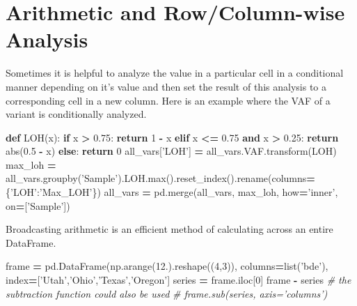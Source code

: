 \documentclass[]{book}
\newenvironment{Shaded}{\begin{snugshade}}{\end{snugshade}}
\newcommand{\BuiltInTok}[1]{#1}
\newcommand{\CommentTok}[1]{\textcolor[rgb]{0.56,0.35,0.01}{\textit{#1}}}
\newcommand{\ControlFlowTok}[1]{\textcolor[rgb]{0.13,0.29,0.53}{\textbf{#1}}}
\newcommand{\DecValTok}[1]{\textcolor[rgb]{0.00,0.00,0.81}{#1}}
\newcommand{\FloatTok}[1]{\textcolor[rgb]{0.00,0.00,0.81}{#1}}
\newcommand{\KeywordTok}[1]{\textcolor[rgb]{0.13,0.29,0.53}{\textbf{#1}}}
\newcommand{\NormalTok}[1]{#1}
\newcommand{\OperatorTok}[1]{\textcolor[rgb]{0.81,0.36,0.00}{\textbf{#1}}}
\newcommand{\StringTok}[1]{\textcolor[rgb]{0.31,0.60,0.02}{#1}}
\begin{document}
\hypertarget{arithmetic-and-rowcolumn-wise-analysis}{%
\section{Arithmetic and Row/Column-wise Analysis}\label{arithmetic-and-rowcolumn-wise-analysis}}

Sometimes it is helpful to analyze the value in a particular cell in a conditional manner depending on it's value and then set the result of this analysis to a corresponding cell in a new column. Here is an example where the VAF of a variant is conditionally analyzed.

\begin{Shaded}
\begin{Highlighting}[]
\KeywordTok{def}\NormalTok{ LOH(x):}
    \ControlFlowTok{if}\NormalTok{ x }\OperatorTok{>} \FloatTok{0.75}\NormalTok{: }\ControlFlowTok{return} \DecValTok{1} \OperatorTok{-}\NormalTok{ x}
    \ControlFlowTok{elif}\NormalTok{ x }\OperatorTok{<=} \FloatTok{0.75} \KeywordTok{and}\NormalTok{ x }\OperatorTok{>} \FloatTok{0.25}\NormalTok{: }\ControlFlowTok{return} \BuiltInTok{abs}\NormalTok{(}\FloatTok{0.5} \OperatorTok{-}\NormalTok{ x)}
    \ControlFlowTok{else}\NormalTok{: }\ControlFlowTok{return} \DecValTok{0}
\NormalTok{all_vars[}\StringTok{'LOH'}\NormalTok{] }\OperatorTok{=}\NormalTok{ all_vars.VAF.transform(LOH)}
\NormalTok{max_loh }\OperatorTok{=}\NormalTok{ all_vars.groupby(}\StringTok{'Sample'}\NormalTok{).LOH.}\BuiltInTok{max}\NormalTok{().reset_index().rename(columns}\OperatorTok{=}\NormalTok{\{}\StringTok{'LOH'}\NormalTok{:}\StringTok{'Max_LOH'}\NormalTok{\})}
\NormalTok{all_vars }\OperatorTok{=}\NormalTok{ pd.merge(all_vars, max_loh, how}\OperatorTok{=}\StringTok{'inner'}\NormalTok{, on}\OperatorTok{=}\NormalTok{[}\StringTok{'Sample'}\NormalTok{])}
\end{Highlighting}
\end{Shaded}

Broadcasting arithmetic is an efficient method of calculating across an entire DataFrame.

\begin{Shaded}
\begin{Highlighting}[]
\NormalTok{frame }\OperatorTok{=}\NormalTok{ pd.DataFrame(np.arange(}\FloatTok{12.}\NormalTok{).reshape((}\DecValTok{4}\NormalTok{,}\DecValTok{3}\NormalTok{)), columns}\OperatorTok{=}\BuiltInTok{list}\NormalTok{(}\StringTok{'bde'}\NormalTok{), index}\OperatorTok{=}\NormalTok{[}\StringTok{'Utah'}\NormalTok{,}\StringTok{'Ohio'}\NormalTok{,}\StringTok{'Texas'}\NormalTok{,}\StringTok{'Oregon'}\NormalTok{]}
\NormalTok{series }\OperatorTok{=}\NormalTok{ frame.iloc[}\DecValTok{0}\NormalTok{]}
\NormalTok{frame }\OperatorTok{-}\NormalTok{ series}
\CommentTok{# the subtraction function could also be used}
\CommentTok{# frame.sub(series, axis='columns')}
\end{Highlighting}
\end{Shaded}
\end{document}
